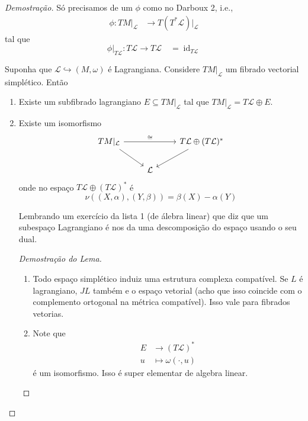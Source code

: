 \begin{proof}[Demostra\c c\~ao]
	S\'o precisamos de um $\phi$ como no Darboux 2, i.e.,
	\begin{align*}
		\phi: TM|_{\mathcal{L}} &\longrightarrow T(T^*\mathcal{L})|_{\mathcal{L}}
	\end{align*}
	tal que
\[\phi|_{T\mathcal{L}}:T\mathcal{L}\to T\mathcal{L}\quad =\operatorname{id}_{T\mathcal{L}}\]

\begin{lemma}
	Suponha que $\mathcal{L}\hookrightarrow (M,\omega)$ \'e Lagrangiana. Considere $TM|_{\mathcal{L}}$ um fibrado vectorial simpl\'etico. Ent\~ao
	\begin{enumerate}
		\item Existe um subfibrado lagrangiano $E\subseteq TM|_{\mathcal{L}}$ tal que $TM|_{\mathcal{L}}=T\mathcal{L}\oplus E$.

		\item Existe um isomorfismo
			\[\begin{tikzcd}
			TM|_{\mathcal{L}}\arrow[rr,"\cong "]\arrow[dr,swap]&&T\mathcal{L}\oplus (T\mathcal{L})^*\arrow[dl]\\
			&\mathcal{L}
			\end{tikzcd}\]
			onde no espaço $T\mathcal{L}\oplus (T\mathcal{L})^*$ \'e
			\[\nu((X,\alpha),(Y,\beta))=\beta(X)-\alpha(Y)\]

			Lembrando um exerc\'icio da lista 1 (de \'alebra linear) que diz que um subespaço Lagrangiano \'e nos da uma descomposi\c c\~ao do espaço usando o seu dual.

			\begin{proof}[Demostra\c c\~ao do Lema]\leavevmode 

				\begin{enumerate}[label=\textbf{Step \arabic*}]
					\item Todo espaço simpl\'etico induiz uma estrutura complexa compat\'ivel.  Se $L$ \'e lagrangiano, $JL$ tamb\'em e o espaço vetorial (acho que isso coincide com o complemento ortogonal na m\'etrica compat\'ivel). Isso vale para fibrados vetorias.

					\item Note que 
						\begin{align*}
							E &\longrightarrow (T\mathcal{L})^* \\
							u &\longmapsto \omega(\cdot ,u)
						\end{align*}
						\'e um isomorfismo. Isso \'e super elementar de algebra linear.


\end{enumerate}
\end{proof}
\end{enumerate}
\end{lemma}
\end{proof}
